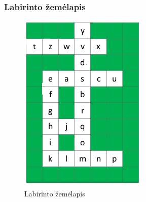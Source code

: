 \subsubsection{Labirinto žemėlapis}

\begin{figure}[H]
  \centering
  \includegraphics[]{content/map.png}
  \caption{Labirinto žemėlapis}
  \label{fig:fc:map}
\end{figure}

